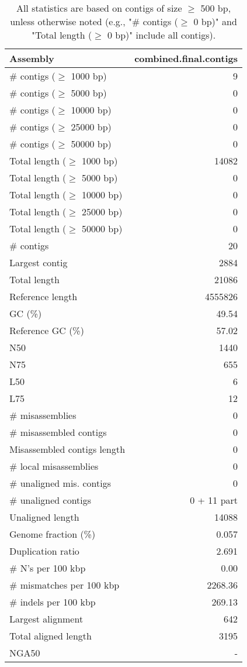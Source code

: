 \documentclass[12pt,a4paper]{article}
\begin{document}
\begin{table}[ht]
\begin{center}
\caption{All statistics are based on contigs of size $\geq$ 500 bp, unless otherwise noted (e.g., "\# contigs ($\geq$ 0 bp)" and "Total length ($\geq$ 0 bp)" include all contigs).}
\begin{tabular}{|l*{1}{|r}|}
\hline
Assembly & combined.final.contigs \\ \hline
\# contigs ($\geq$ 1000 bp) & 9 \\ \hline
\# contigs ($\geq$ 5000 bp) & 0 \\ \hline
\# contigs ($\geq$ 10000 bp) & 0 \\ \hline
\# contigs ($\geq$ 25000 bp) & 0 \\ \hline
\# contigs ($\geq$ 50000 bp) & 0 \\ \hline
Total length ($\geq$ 1000 bp) & 14082 \\ \hline
Total length ($\geq$ 5000 bp) & 0 \\ \hline
Total length ($\geq$ 10000 bp) & 0 \\ \hline
Total length ($\geq$ 25000 bp) & 0 \\ \hline
Total length ($\geq$ 50000 bp) & 0 \\ \hline
\# contigs & 20 \\ \hline
Largest contig & 2884 \\ \hline
Total length & 21086 \\ \hline
Reference length & 4555826 \\ \hline
GC (\%) & 49.54 \\ \hline
Reference GC (\%) & 57.02 \\ \hline
N50 & 1440 \\ \hline
N75 & 655 \\ \hline
L50 & 6 \\ \hline
L75 & 12 \\ \hline
\# misassemblies & 0 \\ \hline
\# misassembled contigs & 0 \\ \hline
Misassembled contigs length & 0 \\ \hline
\# local misassemblies & 0 \\ \hline
\# unaligned mis. contigs & 0 \\ \hline
\# unaligned contigs & 0 + 11 part \\ \hline
Unaligned length & 14088 \\ \hline
Genome fraction (\%) & 0.057 \\ \hline
Duplication ratio & 2.691 \\ \hline
\# N's per 100 kbp & 0.00 \\ \hline
\# mismatches per 100 kbp & 2268.36 \\ \hline
\# indels per 100 kbp & 269.13 \\ \hline
Largest alignment & 642 \\ \hline
Total aligned length & 3195 \\ \hline
NGA50 & - \\ \hline
\end{tabular}
\end{center}
\end{table}
\end{document}
